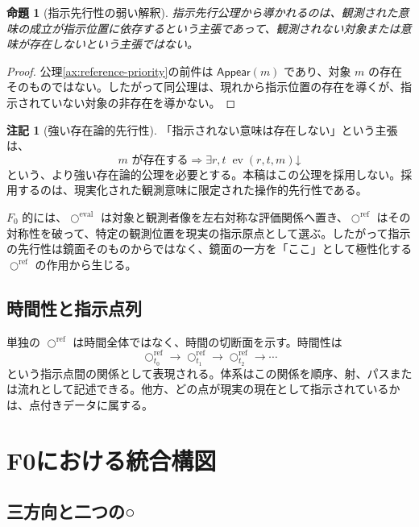 \documentclass[a4paper,11pt]{ltjsarticle}
\theoremstyle{definition}
\newtheorem{remark}[definition]{注記}
\theoremstyle{plain}
\newtheorem{proposition}[definition]{命題}
\newcommand{\CircleRef}{\bigcirc^{\mathrm{ref}}}
\newcommand{\CircleEval}{\bigcirc^{\mathrm{eval}}}
\begin{document}
\begin{proposition}[指示先行性の弱い解釈]
指示先行公理から導かれるのは、観測された意味の成立が指示位置に依存するという主張であって、観測されない対象または意味が存在しないという主張ではない。
\end{proposition}

\begin{proof}
公理\eqref{ax:reference-priority}の前件は $\mathsf{Appear}(m)$ であり、対象 $m$ の存在そのものではない。したがって同公理は、現れから指示位置の存在を導くが、指示されていない対象の非存在を導かない。
\end{proof}

\begin{remark}[強い存在論的先行性]
「指示されない意味は存在しない」という主張は、
\begin{equation}
 m\text{ が存在する}
 \Longrightarrow
 \exists r,t\;\operatorname{ev}(r,t,m)\mathord\downarrow
\end{equation}
という、より強い存在論的公理を必要とする。本稿はこの公理を採用しない。採用するのは、現実化された観測意味に限定された操作的先行性である。
\end{remark}

$F_0$ 的には、$\CircleEval$ は対象と観測者像を左右対称な評価関係へ置き、$\CircleRef$ はその対称性を破って、特定の観測位置を現実の指示原点として選ぶ。したがって指示の先行性は鏡面そのものからではなく、鏡面の一方を「ここ」として極性化する $\CircleRef$ の作用から生じる。

\subsection{時間性と指示点列}

単独の $\CircleRef$ は時間全体ではなく、時間の切断面を示す。時間性は
\begin{equation}
 \CircleRef_{t_0}\longrightarrow
 \CircleRef_{t_1}\longrightarrow
 \CircleRef_{t_2}\longrightarrow\cdots
\end{equation}
という指示点間の関係として表現される。体系はこの関係を順序、射、パスまたは流れとして記述できる。他方、どの点が現実の現在として指示されているかは、点付きデータに属する。

\section{F0における統合構図}

\subsection{三方向と二つの○}
\end{document}
